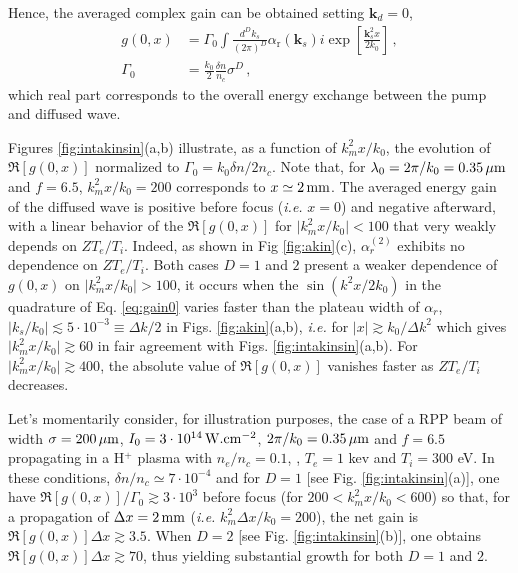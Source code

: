 \documentclass[
 reprint,
 amsmath,amssymb,
 aps,
]{revtex4-1}
\begin{document}
Hence, the averaged complex gain can be obtained setting $\mathbf{k}_d=0$,
\begin{align}
g(0,x)&=  \Gamma_0 \int \frac{d^Dk_s}{(2\pi)^D}  \alpha_\mathrm{r}(\mathbf{k}_s) 
i\exp\left[ \frac{\mathbf{k}_s^2 x}{2k_0}\right]\, , \nonumber\\
\Gamma_0&=\frac{k_0}{2}  \frac{\delta n}{n_c}
  \sigma^D \, ,
\label{eq:gain0}
\end{align}
which real part corresponds to the overall energy exchange between the pump and diffused wave.

Figures \ref{fig:intakinsin}(a,b) illustrate, as a function of $k_m^2 x /k_0$, the evolution of $\Re[g(0,x)]$
normalized to $\Gamma_0=k_0\delta n / 2n_c$. Note that, for $\lambda_0=2\pi/k_0=0.35\,\rm\mu m$ and $f=6.5$,  $k_m^2 x /k_0=200$ corresponds to $x\simeq 2\,\rm mm$. 
The averaged energy gain of the diffused wave is positive before focus (\emph{i.e.} $x=0$) and negative afterward, with  a linear behavior of the $\Re[g(0,x)]$ for  $\vert k_m^2 x /k_0 \vert < 100$  that very weakly depends on $ZT_e/T_i$.  Indeed, as shown in Fig \ref{fig:akin}(c), $\alpha_r^{(2)}$ exhibits no dependence  on $ZT_e/T_i$. Both cases $D=1$ and $2$ present a weaker dependence of $g(0,x)$ on $\vert k_m^2 x /k_0 \vert > 100$, it occurs when the $\sin(k^2x/2k_0)$ in the quadrature of Eq. \eqref{eq:gain0} varies faster than the plateau width of $\alpha_r$, $\vert k_s/k_0\vert \lesssim 5\cdot 10^{-3}\equiv \Delta k /2$ in Figs. \ref{fig:akin}(a,b), \emph{i.e.} for $\vert x\vert \gtrsim k_0/\Delta k^2$ which gives $\vert k_m^2x/k_0 \vert  \gtrsim 60  $ in fair  agreement with Figs. \ref{fig:intakinsin}(a,b).
For $\vert k_m^2 x /k_0 \vert \gtrsim 400$, the absolute value of $\Re[g(0,x)]$ vanishes faster as $ZT_e/T_i$ decreases. 

Let's momentarily consider, for illustration purposes,  the  case of a RPP beam of width $\sigma =200\,\rm\mu m$, $I_0=3\cdot 10^{14} \,\rm W.cm^{-2}$, $2\pi/k_0 = 0.35\,\rm\mu m$ and $f = 6.5$ propagating in a H$^{+}$ plasma with $n_e/n_c=0.1$, , $T_e=1$ kev and $T_i=300$ eV. In these conditions, $\delta n/n_c \simeq 7\cdot 10^{-4}$ and  for $D=1$ [see Fig. \ref{fig:intakinsin}(a)], one have $\Re[g(0,x)]/\Gamma_0 \gtrsim 3\cdot 10^3$ before focus (for $200< k_m^2 x/k_0 < 600$) so that, for  a propagation of $\Delta x = 2\,\rm mm$ (\emph{i.e.} $k_m^2 \Delta x/k_0 = 200$), the net gain is $\Re[g(0,x)]\Delta x\gtrsim 3.5 $. When $D=2$ [see Fig. \ref{fig:intakinsin}(b)], one obtains $\Re[g(0,x)]\Delta x\gtrsim 70 $, thus yielding substantial growth for both $D=1$ and $2$.
\end{document}
